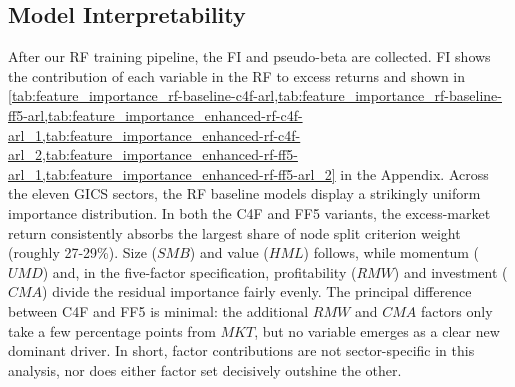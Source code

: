 


\subsection{Model Interpretability}

After our RF training pipeline, the FI and pseudo-beta are collected. FI shows the contribution of each variable in the RF to excess returns and shown in \cref{tab:feature_importance_rf-baseline-c4f-arl,tab:feature_importance_rf-baseline-ff5-arl,tab:feature_importance_enhanced-rf-c4f-arl_1,tab:feature_importance_enhanced-rf-c4f-arl_2,tab:feature_importance_enhanced-rf-ff5-arl_1,tab:feature_importance_enhanced-rf-ff5-arl_2} in the Appendix. Across the eleven GICS sectors, the RF baseline models display a strikingly uniform importance distribution. In both the C4F and FF5 variants, the excess-market return consistently absorbs the largest share of node split criterion weight (roughly 27-29\%). Size ($SMB$) and value ($HML$) follows, while momentum ($UMD$) and, in the five-factor specification, profitability ($RMW$) and investment ($CMA$) divide the residual importance fairly evenly. The principal difference between C4F and FF5 is minimal: the additional $RMW$ and $CMA$ factors only take a few percentage points from $MKT$, but no variable emerges as a clear new dominant driver. In short, factor contributions are not sector-specific in this analysis, nor does either factor set decisively outshine the other.

